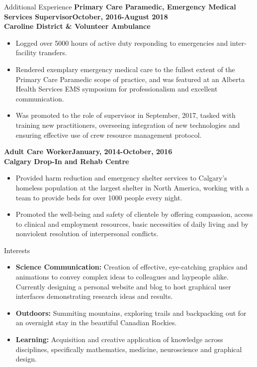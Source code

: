 \documentclass[12pt]{resume}
\begin{document}
\begin{rSection}{\Large Additional Experience}
    {\bf Primary Care Paramedic, Emergency Medical Services Supervisor\hfill {October, 2016-August 2018}}\\
    {\bf Caroline District \& Volunteer Ambulance}
    \begin{itemize} 
        \setlength\itemsep{-0.5em}
        \item Logged over 5000 hours of active duty responding to emergencies and inter-facility transfers.
        \item Rendered exemplary emergency medical care to the fullest extent of the Primary Care Paramedic scope of
        practice, and was featured at an Alberta Health Services EMS symposium for professionalism and 
        excellent communication.
        \item Was promoted to the role of supervisor in September, 2017, tasked with training new practitioners, 
        overseeing integration of new technologies and ensuring effective use of crew resource management protocol.
    \end{itemize}
    {\bf Adult Care Worker\hfill {January, 2014-October, 2016}}\\
    {\bf Calgary Drop-In and Rehab Centre}
    \begin{itemize}
        \setlength\itemsep{-0.5em}
        \item Provided harm reduction and emergency shelter services to Calgary's homeless population at the largest 
        shelter in North America, working with a team to provide beds for over 1000 people every night.
        \item Promoted the well-being and safety of clientele by offering compassion, access to clinical and employment
        resources, basic necessities of daily living and by nonviolent resolution of interpersonal conflicts. 
    \end{itemize}
\end{rSection}

\begin{rSection}{\Large Interests}
    \begin{itemize}
        \setlength\itemsep{-0.5em}
        \item {\bf Science Communication:} Creation of effective, eye-catching graphics and animations to convey complex
        ideas to colleagues and laypeople alike. Currently designing a personal website and blog to host 
        graphical user interfaces demonstrating research ideas and results.
        \item {\bf Outdoors:} Summiting mountains, exploring trails and backpacking out for an overnight stay in the beautiful
        Canadian Rockies. 
        \item {\bf Learning:} Acquisition and creative application of knowledge across disciplines, specifically mathematics, medicine,
        neuroscience and graphical design.
    \end{itemize}
\end{rSection}
\end{document}
